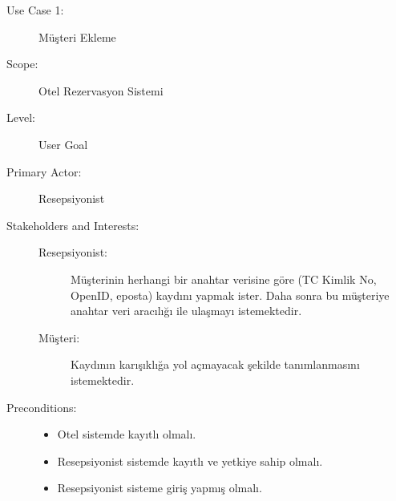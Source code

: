 \documentclass[12pt,a4paper]{report}
\begin{document}
\begin{description}
\item[Use Case 1:] Müşteri Ekleme \\
\item[Scope:] Otel Rezervasyon Sistemi
\item[Level:] User Goal
\item[Primary Actor:] Resepsiyonist 
\item[Stakeholders and Interests:] \hspace{10 mm}
\begin{description} 
\item[Resepsiyonist:] Müşterinin herhangi bir anahtar verisine göre 
(TC Kimlik No, OpenID, eposta) kaydını yapmak ister. Daha sonra bu 
müşteriye anahtar veri aracılığı ile ulaşmayı istemektedir.
\item[Müşteri:] Kaydının karışıklığa yol açmayacak şekilde tanımlanmasını istemektedir.
\end{description}
\item[Preconditions:] \hspace{10mm}
\begin{itemize}
\item Otel sistemde kayıtlı olmalı.
\item Resepsiyonist sistemde kayıtlı ve yetkiye sahip olmalı.
\item Resepsiyonist sisteme giriş yapmış olmalı.
\end{itemize}


\end{description}
\end{document}
